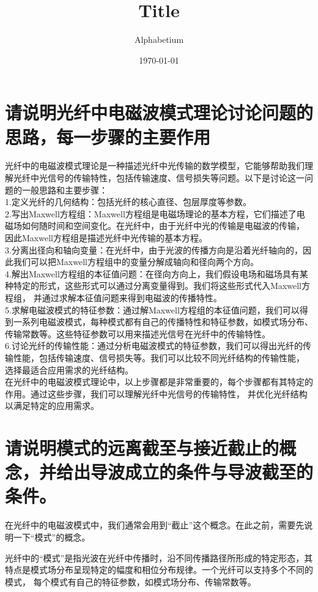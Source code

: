 \documentclass[12pt, a4paper, oneside]{article}
\title{Title}
\date{\today}
\author{Alphabetium}
\begin{document}
\begin{spacing}{2.0}
\maketitle


\section{请说明光纤中电磁波模式理论讨论问题的思路，每一步骤的主要作用}
光纤中的电磁波模式理论是一种描述光纤中光传输的数学模型，它能够帮助我们理解光纤中光信号的传输特性，包括传输速度、信号损失等问题。以下是讨论这一问题的一般思路和主要步骤：
\\
1.定义光纤的几何结构：包括光纤的核心直径、包层厚度等参数。
\\
2.写出Maxwell方程组：Maxwell方程组是电磁场理论的基本方程，它们描述了电磁场如何随时间和空间变化。在光纤中，由于光纤中光的传输是电磁波的传输，
因此Maxwell方程组是描述光纤中光传输的基本方程。
\\
3.分离出径向和轴向变量：在光纤中，由于光波的传播方向是沿着光纤轴向的，因此我们可以把Maxwell方程组中的变量分解成轴向和径向两个方向。
\\
4.解出Maxwell方程组的本征值问题：在径向方向上，我们假设电场和磁场具有某种特定的形式，这些形式可以通过分离变量得到。我们将这些形式代入Maxwell方程组，
并通过求解本征值问题来得到电磁波的传播特性。
\\
5.求解电磁波模式的特征参数：通过解Maxwell方程组的本征值问题，我们可以得到一系列电磁波模式，每种模式都有自己的传播特性和特征参数，如模式场分布、
传输常数等。这些特征参数可以用来描述光信号在光纤中的传输特性。
\\
6.讨论光纤的传输性能：通过分析电磁波模式的特征参数，我们可以得出光纤的传输性能，包括传输速度、信号损失等。我们可以比较不同光纤结构的传输性能，
选择最适合应用需求的光纤结构。
\\
在光纤中的电磁波模式理论中，以上步骤都是非常重要的，每个步骤都有其特定的作用。通过这些步骤，我们可以理解光纤中光信号的传输特性，
并优化光纤结构以满足特定的应用需求。

\section{请说明模式的远离截至与接近截止的概念，并给出导波成立的条件与导波截至的条件。}
在光纤中的电磁波模式中，我们通常会用到“截止”这个概念。在此之前，需要先说明一下“模式”的概念。

光纤中的“模式”是指光波在光纤中传播时，沿不同传播路径所形成的特定形态，其特点是模式场分布呈现特定的幅度和相位分布规律。一个光纤可以支持多个不同的模式，
每个模式有自己的特征参数，如模式场分布、传输常数等。


\end{spacing}
\end{document}
